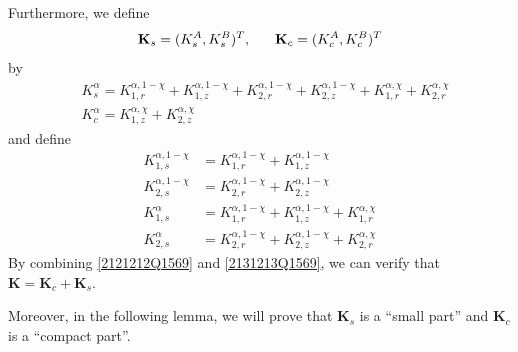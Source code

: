 \documentclass[reqno]{amsart}
\numberwithin{equation}{section}
\numberwithin{equation}{section}
\begin{document}
	Furthermore, we define 
	\begin{equation*}
		\mathbf{K}_s=(K^A_s,K^B_s)^{T},\hspace{0.6cm} \mathbf{K}_c=(K^A_c,K^B_c)^{T}
	\end{equation*}
	by
	\begin{equation}\label{2131213Q1569}
		\begin{split}
			&K^{\alpha}_s = K_{1,r}^{\alpha,1-\chi}+K_{1,z}^{\alpha,1-\chi}+K_{2,r}^{\alpha,1-\chi}+K_{2,z}^{\alpha,1-\chi}+K_{1,r}^{\alpha,\chi}+K_{2,r}^{\alpha,\chi}	\\
			&K^{\alpha}_c = K_{1,z}^{\alpha,\chi}+K_{2,z}^{\alpha,\chi}
		\end{split}	
	\end{equation}	
	and define
	\begin{equation}\label{2141214Q1569}
		\begin{split}
				K^{\alpha,1-\chi}_{1,s} &=K_{1,r}^{\alpha,1-\chi}+K_{1,z}^{\alpha,1-\chi}\\
			K^{\alpha,1-\chi}_{2,s} &=K_{2,r}^{\alpha,1-\chi}+K_{2,z}^{\alpha,1-\chi}\\
			K^{\alpha}_{1,s} &=K_{1,r}^{\alpha,1-\chi}+K_{1,z}^{\alpha,1-\chi}+K_{1,r}^{\alpha,\chi}\\
			K^{\alpha}_{2,s} &=K_{2,r}^{\alpha,1-\chi}+K_{2,z}^{\alpha,1-\chi}+K_{2,r}^{\alpha,\chi}
		\end{split}	
	\end{equation}	
	By combining \eqref{2121212Q1569} and \eqref{2131213Q1569}, we can verify that $\mathbf{K} = \mathbf{K}_c + \mathbf{K}_s$.
	
	Moreover, in the following lemma, we will prove that  $\mathbf{K}_s$  is a ``small part'' and   $\mathbf{K}_c$ is a ``compact part''.
	
	
	
	
	
\end{document}
